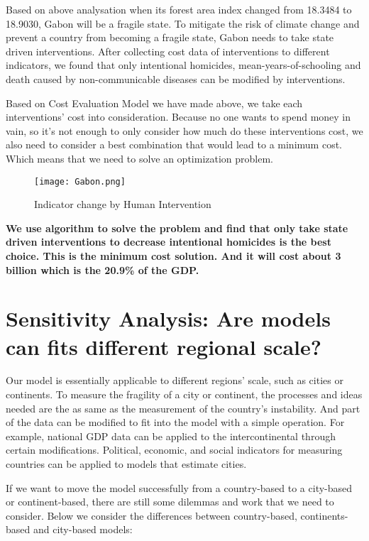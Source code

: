 \documentclass{mcmthesis}
\begin{document}
			
			Based on above analysation when its forest area index changed from 18.3484 to 18.9030, Gabon will be a fragile state. To mitigate the risk of climate change and prevent a country from becoming a fragile state, Gabon needs to take state driven interventions. After collecting cost data of interventions to different indicators, we found that only intentional homicides, mean-years-of-schooling and death caused by non-communicable diseases can be modified by interventions. 
			
			
			Based on Cost Evaluation Model we have made above, we take each interventions’ cost into consideration. Because no one wants to spend money in vain, so it’s not enough to only consider how much do these interventions cost, we also need to consider a best combination that would lead to a minimum cost. Which means that we need to solve an optimization problem.
			
			\begin{figure}[h]
				\small
				\centering
				\texttt{[image: Gabon.png]}
				\caption{Indicator change by Human Intervention}
				\label{fig:Gabon}
			\end{figure}
		
			\textbf{We use algorithm to solve the problem and find that only take state driven interventions to decrease intentional homicides is the best choice. This is the minimum cost solution. And it will cost about 3 billion which is the 20.9\% of the GDP.}
			
		
	
	\section{Sensitivity Analysis: Are models can fits different regional scale?}	
	
		Our model is essentially applicable to different regions' scale, such as cities or continents. To measure the fragility of a city or continent, the processes and ideas needed are the as same as the measurement of the country's instability. And part of the data can be modified to fit into the model with a simple operation. For example, national GDP data can be applied to the intercontinental through certain modifications. Political, economic, and social indicators for measuring countries can be applied to models that estimate cities.
		
		If we want to move the model successfully from a country-based to a city-based or continent-based, there are still some dilemmas and work that we need to consider. Below we consider the differences between country-based, continents-based and city-based models:
		
\end{document}
